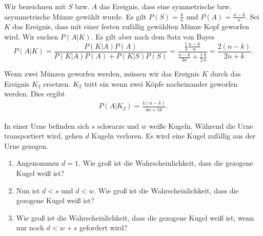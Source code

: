 \solution Wir bezeichnen mit $S$ bzw. $A$ das Ereignis, dass eine
symmetrische bzw. asymmetrische Münze gewählt wurde. Es gilt $P(S) = \frac{k}{n}$
und $P(A)=\frac{n-k}{n}$. Sei $K$ das Ereignis, dass mit einer festen zufällig
gewählten Münze Kopf geworfen wird. Wir suchen $P(A | K)$. Es gilt aber nach dem
Satz von Bayes
\begin{equation*}
    P( A | K) = \frac{ P( K | A) P(A) }{ P(K | A) P(A) + P(K | S) P(S) }
    = \frac{\frac{1}{3} \frac{n-k}{n} }{ \frac{n-k}{3 n} + \frac{1}{2} \frac{k}{n}} 
    = \frac{2(n-k)}{2n + k}.
\end{equation*}

Wenn zwei Münzen geworfen werden, müssen wir das Ereignis $K$ durch das Ereignis $K_2$ ersetzen. 
$K_2$ tritt ein wenn zwei Köpfe nacheinander geworfen werden. Dies ergibt
\begin{align*}
    P\left( A | K_{2} \right) = \frac{4(n-k)}{4n + 5k}. 
\end{align*}




 In einer Urne befinden
sich $s$ schwarze und $w$ weiße Kugeln. Während die Urne transportiert wird,
gehen $d$ Kugeln verloren. Es wird eine Kugel zufällig aus der Urne gezogen.
\begin{enumerate}
    \item Angenommen $d=1$. Wie groß ist die Wahrscheinlichkeit, dass die
        gezogene Kugel weiß ist?
    \item Nun ist $d<s$ und $d<w$. Wie groß ist die Wahrscheinlichkeit, dass die
        gezogene Kugel weiß ist?
    \item Wie groß ist die Wahrscheinlichkeit, dass die gezogene Kugel weiß
        ist, wenn nur noch $d<w+s$ gefordert wird?
\end{enumerate}

